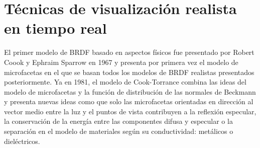 
\section{T\'ecnicas de visualizaci\'on realista en tiempo real}

El primer modelo de BRDF basado en aspectos f\'isicos fue presentado por Robert Coook y Ephraim Sparrow en 1967 \autocite{torrancesparrow}
y presenta por primera vez el modelo de microfacetas en el que se basan todos los modelos de BRDF realistas presentados posteriormente.
Ya en 1981, el modelo de Cook-Torrance \autocite{cooktorrance} combina las ideas del modelo de microfacetas y la funci\'on de distribuci\'on
de las normales de Beckmann \autocite{beckmann} y presenta nuevas ideas como que solo las microfacetas orientadas en direcci\'on al
vector medio entre la luz y el puntos de vista contribuyen a la reflexi\'on especular, la conservaci\'on de la energ\'ia entre las
componentes difusa y especular o la separaci\'on en el modelo de materiales seg\'un su conductividad: met\'alicos o diel\'ectricos.




